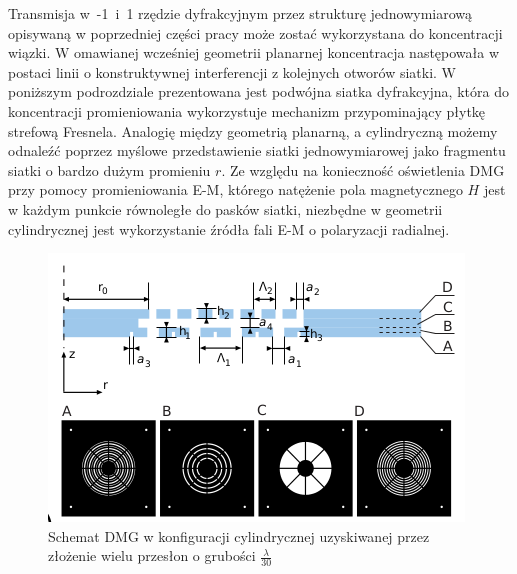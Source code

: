 Transmisja w~-1~i~1 rzędzie dyfrakcyjnym przez strukturę jednowymiarową opisywaną w poprzedniej części pracy może zostać wykorzystana do koncentracji wiązki. W omawianej wcześniej geometrii planarnej koncentracja następowała w postaci linii o konstruktywnej interferencji z kolejnych otworów siatki. W poniższym podrozdziale prezentowana jest podwójna siatka dyfrakcyjna, która do koncentracji promieniowania wykorzystuje mechanizm przypominający płytkę strefową Fresnela. Analogię między geometrią planarną, a cylindryczną możemy odnaleźć poprzez myślowe przedstawienie siatki jednowymiarowej jako fragmentu siatki o bardzo dużym promieniu $r$. Ze względu na konieczność oświetlenia DMG przy pomocy promieniowania E-M, którego natężenie pola magnetycznego $H$ jest w każdym punkcie równoległe do pasków siatki, niezbędne w geometrii cylindrycznej jest wykorzystanie źródła fali E-M o polaryzacji radialnej. 

\begin{figure}
	\includegraphics[width=\textwidth]{images/dmg/express_siatki.png}
	\caption{Schemat DMG w konfiguracji cylindrycznej uzyskiwanej przez złożenie wielu przesłon o grubości $\frac{\lambda}{30}$ \cite{Yavorskiy:14}}
	\label{fig:schem-cyl}
\end{figure}


